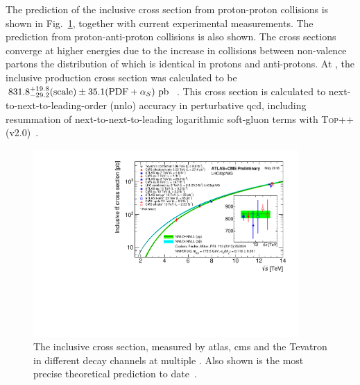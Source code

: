 The prediction of the inclusive \ttbar{} cross section from proton-proton collisions is shown in Fig.~\ref{fig:incttbar}, together with current experimental measurements. 
The prediction from proton-anti-proton collisions is also shown.
The cross sections converge at higher energies due to the increase in collisions between non-valence partons the distribution of which is identical in protons and anti-protons.
At \com{}, the inclusive \ttbar{} production cross section was calculated to be $831.8^{+19.8}_{-29.2}(\text{scale})\pm35.1(\text{PDF}+\alpha_S)\mathrm{~pb}^{}$~\cite{TOPpp}.
This \ttbar{} cross section is calculated to next-to-next-to-leading-order (\acrshort{nnlo}) accuracy in perturbative \acrshort{qcd}, including resummation of next-to-next-to-leading logarithmic soft-gluon terms with \textsc{Top++} (v2.0)~\cite{Th:XSEC1,Th:XSEC2,Th:XSEC3,Th:XSEC4,Th:XSEC5,Th:XSEC6,Th:XSEC7}.
\begin{figure}[htpb]
	\centering
	\includegraphics[width=0.9\textwidth]{Figures/tt_curve_toplhcwg_may18.pdf}
	\caption[The inclusive \ttbar cross section, measured by \acrshort{atlas}, \acrshort{cms} and the Tevatron in different decay channels at multiple \sqrts{}. Also shown is the most precise theoretical prediction to date.]{ The inclusive \ttbar cross section, measured by \acrshort{atlas}, \acrshort{cms} and the Tevatron in different decay channels at multiple \sqrts{}. Also shown is the most precise theoretical prediction to date~\cite{LHCTopWG_Plots}. }
	\label{fig:incttbar}
\end{figure}

